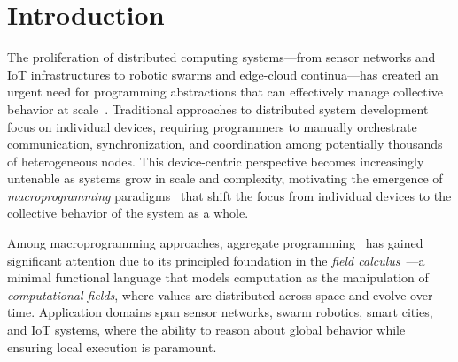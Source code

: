 \documentclass[runningheads]{llncs}
\begin{document}
\section{Introduction}\label{sec:introduction}
The proliferation of distributed computing 
 systems---from sensor networks and IoT infrastructures to robotic swarms and edge-cloud continua---has 
 created an urgent need for programming abstractions 
 that can effectively manage collective behavior at scale~\cite{DBLP:journals/csur/Casadei23}.
%
Traditional approaches to distributed system development focus on individual devices,
 requiring programmers to manually orchestrate communication, 
 synchronization, 
 and coordination among potentially thousands of heterogeneous nodes.
%
This device-centric perspective becomes increasingly untenable as systems grow in scale and complexity, 
 motivating the emergence of \emph{macroprogramming} paradigms~\cite{10.1145/3712004}
 that shift the focus from individual devices to the collective behavior of the system as a whole.

Among macroprogramming approaches, 
 aggregate programming~\cite{DBLP:journals/computer/BealPV15} 
 has gained significant attention due to its principled foundation in the \emph{field calculus}~\cite{DBLP:journals/tocl/AudritoVDPB19}---a minimal functional language that models computation as the manipulation of \emph{computational fields}, 
 where values are distributed across space and evolve over time.
%
%
Application domains span sensor networks, swarm robotics, smart cities, and IoT systems, 
 where the ability to reason about global behavior while ensuring local execution is paramount.
\end{document}
